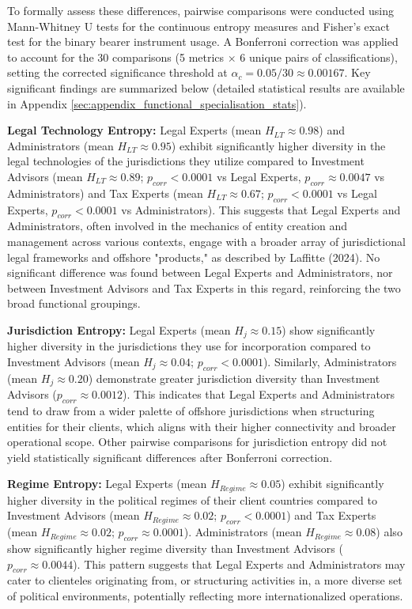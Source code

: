To formally assess these differences, pairwise comparisons were conducted using Mann-Whitney U tests for the continuous entropy measures and Fisher's exact test for the binary bearer instrument usage. A Bonferroni correction was applied to account for the 30 comparisons (5 metrics $\times$ 6 unique pairs of classifications), setting the corrected significance threshold at $\alpha_c = 0.05/30 \approx 0.00167$. Key significant findings are summarized below (detailed statistical results are available in Appendix \ref{sec:appendix_functional_specialisation_stats}).

\textbf{Legal Technology Entropy:}
Legal Experts (mean $H_{LT} \approx 0.98$) and Administrators (mean $H_{LT} \approx 0.95$) exhibit significantly higher diversity in the legal technologies of the jurisdictions they utilize compared to Investment Advisors (mean $H_{LT} \approx 0.89$; $p_{corr} < 0.0001$ vs Legal Experts, $p_{corr} \approx 0.0047$ vs Administrators) and Tax Experts (mean $H_{LT} \approx 0.67$; $p_{corr} < 0.0001$ vs Legal Experts, $p_{corr} < 0.0001$ vs Administrators). This suggests that Legal Experts and Administrators, often involved in the mechanics of entity creation and management across various contexts, engage with a broader array of jurisdictional legal frameworks and offshore "products," as described by Laffitte (2024). No significant difference was found between Legal Experts and Administrators, nor between Investment Advisors and Tax Experts in this regard, reinforcing the two broad functional groupings.

\textbf{Jurisdiction Entropy:}
Legal Experts (mean $H_j \approx 0.15$) show significantly higher diversity in the jurisdictions they use for incorporation compared to Investment Advisors (mean $H_j \approx 0.04$; $p_{corr} < 0.0001$). Similarly, Administrators (mean $H_j \approx 0.20$) demonstrate greater jurisdiction diversity than Investment Advisors ($p_{corr} \approx 0.0012$). This indicates that Legal Experts and Administrators tend to draw from a wider palette of offshore jurisdictions when structuring entities for their clients, which aligns with their higher connectivity and broader operational scope. Other pairwise comparisons for jurisdiction entropy did not yield statistically significant differences after Bonferroni correction.

\textbf{Regime Entropy:}
Legal Experts (mean $H_{Regime} \approx 0.05$) exhibit significantly higher diversity in the political regimes of their client countries compared to Investment Advisors (mean $H_{Regime} \approx 0.02$; $p_{corr} < 0.0001$) and Tax Experts (mean $H_{Regime} \approx 0.02$; $p_{corr} \approx 0.0001$). Administrators (mean $H_{Regime} \approx 0.08$) also show significantly higher regime diversity than Investment Advisors ($p_{corr} \approx 0.0044$). This pattern suggests that Legal Experts and Administrators may cater to clienteles originating from, or structuring activities in, a more diverse set of political environments, potentially reflecting more internationalized operations.

